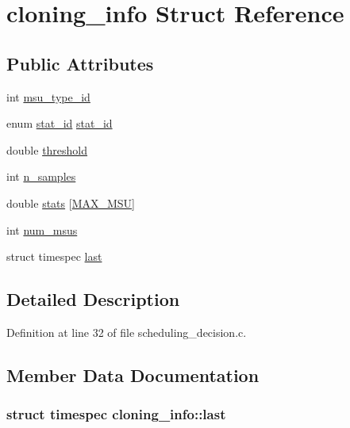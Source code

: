 \hypertarget{structcloning__info}{\section{cloning\-\_\-info Struct Reference}
\label{structcloning__info}
}
\subsection*{Public Attributes}
\begin{DoxyCompactItemize}
\item 
int \hyperlink{structcloning__info_a33d2da60c6da8d63787ccd31abb1dcd2}{msu\-\_\-type\-\_\-id}
\item 
enum \hyperlink{stat__ids_8h_ac210bd14ba53357098c0b3ebdd69784e}{stat\-\_\-id} \hyperlink{structcloning__info_ae9b537be6398899a7e53f694445bc867}{stat\-\_\-id}
\item 
double \hyperlink{structcloning__info_a8921289494a18492f6db5396e36fda15}{threshold}
\item 
int \hyperlink{structcloning__info_a40588709a6807365c9d2a8554f08054d}{n\-\_\-samples}
\item 
double \hyperlink{structcloning__info_ae5a0cd5ac7c7fdce2c04cf7f18b1e867}{stats} \mbox{[}\hyperlink{dfg_8h_ae4dc3586073212cd441edfe4134132f3}{M\-A\-X\-\_\-\-M\-S\-U}\mbox{]}
\item 
int \hyperlink{structcloning__info_a0d133d4ff8e0148eee7cda34b3e5627f}{num\-\_\-msus}
\item 
struct timespec \hyperlink{structcloning__info_aa59abaec6058e1037d9b0b9899dc2475}{last}
\end{DoxyCompactItemize}


\subsection{Detailed Description}


Definition at line 32 of file scheduling\-\_\-decision.\-c.



\subsection{Member Data Documentation}
\hypertarget{structcloning__info_aa59abaec6058e1037d9b0b9899dc2475}{
\subsubsection[{last}]{\setlength{\rightskip}{0pt plus 5cm}struct timespec cloning\-\_\-info\-::last}}\label{structcloning__info_aa59abaec6058e1037d9b0b9899dc2475}


